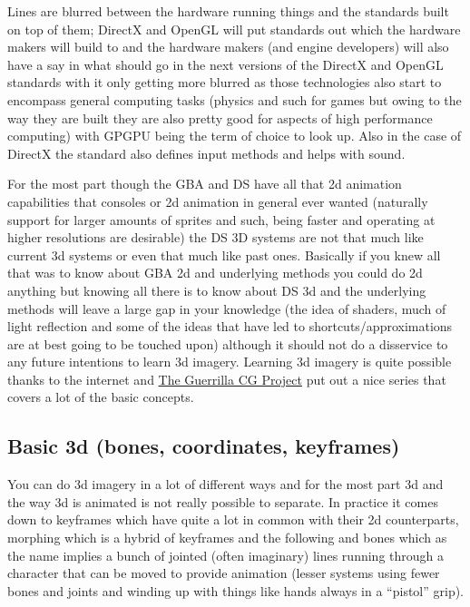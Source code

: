\documentclass[
]{book}
\begin{document}
Lines are blurred between the hardware running things and the standards built on top of them; DirectX and OpenGL will put standards out which the hardware makers will build to and the hardware makers (and engine developers) will also have a say in what should go in the next versions of the DirectX and OpenGL standards with it only getting more blurred as those technologies also start to encompass general computing tasks (physics and such for games but owing to the way they are built they are also pretty good for aspects of high performance computing) with GPGPU being the term of choice to look up. Also in the case of DirectX the standard also defines input methods and helps with sound.

For the most part though the GBA and DS have all that 2d animation capabilities that consoles or 2d animation in general ever wanted (naturally support for larger amounts of sprites and such, being faster and operating at higher resolutions are desirable) the DS 3D systems are not that much like current 3d systems or even that much like past ones. Basically if you knew all that was to know about GBA 2d and underlying methods you could do 2d anything but knowing all there is to know about DS 3d and the underlying methods will leave a large gap in your knowledge (the idea of shaders, much of light reflection and some of the ideas that have led to shortcuts/approximations are at best going to be touched upon) although it should not do a disservice to any future intentions to learn 3d imagery. Learning 3d imagery is quite possible thanks to the internet and \href{http://www.youtube.com/playlist?list=PL6A7DF3D7866EB076\&feature=plpp}{The Guerrilla CG Project} put out a nice series that covers a lot of the basic concepts.

\hypertarget{basic-3d-bones-coordinates-keyframes}{%
\subsection{Basic 3d (bones, coordinates, keyframes)}\label{basic-3d-bones-coordinates-keyframes}}

You can do 3d imagery in a lot of different ways and for the most part 3d and the way 3d is animated is not really possible to separate. In practice it comes down to keyframes which have quite a lot in common with their 2d counterparts, morphing which is a hybrid of keyframes and the following and bones which as the name implies a bunch of jointed (often imaginary) lines running through a character that can be moved to provide animation (lesser systems using fewer bones and joints and winding up with things like hands always in a ``pistol'' grip).
\end{document}
